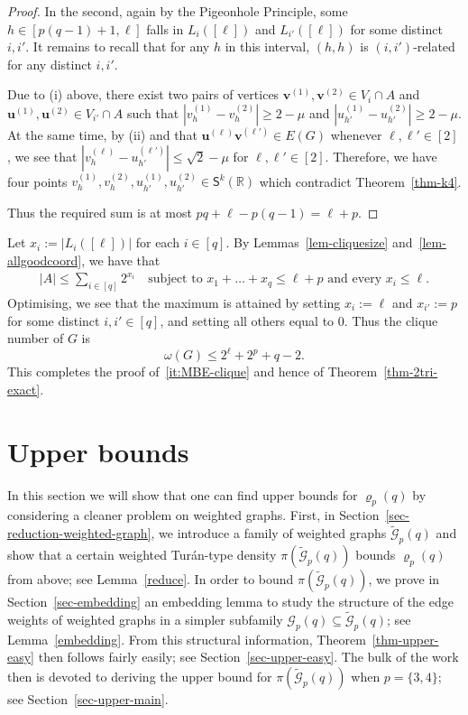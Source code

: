 \documentclass[11pt, a4paper]{article}
\newcommand{\V}[1]{\mathbold{#1}}
\theoremstyle{definition}
\newcommand{\cG}{\mathcal{G}}
\newcommand{\sS}{\mathsf{S}}
\begin{document}
\begin{proof}
	In the second, again by the Pigeonhole Principle, some $h\in [p(q-1)+1,\ell]$ falls in $L_i([\ell])$ and $L_{i'}([\ell])$ for some distinct $i,i'$. It remains to recall that for any $h$ in this interval, $(h,h)$ is $(i,i')$-related for any distinct $i,i'$.
	
	Due to (i) above, there exist two pairs of vertices $\V{v}^{(1)},\V{v}^{(2)}\in V_{i}\cap A$ and $\V{u}^{(1)},\V{u}^{(2)}\in V_{i'}\cap A$ such that $|v^{(1)}_{h} - v^{(2)}_{h}|\ge 2-\mu$ and $|u^{(1)}_{h'} - u^{(2)}_{h'}|\ge 2-\mu$. At the same time, by (ii) and that $\V{u}^{(\ell)}\V{v}^{(\ell')} \in E(G)$ whenever $\ell,\ell' \in [2]$, we see that 
	$|v^{(\ell)}_h-u^{(\ell')}_{h'}| \leq \sqrt{2}-\mu$ for $\ell,\ell' \in [2]$.
	Therefore, we have four points $v^{(1)}_{h},v^{(2)}_{h},u^{(1)}_{h'},u^{(2)}_{h'}\in \sS^k(\mathbb{R})$ which contradict Theorem~\ref{thm-k4}.
	
	Thus the required sum is at most $pq+\ell-p(q-1) = \ell+p$.
\end{proof}

Let $x_i := |L_i([\ell])|$ for each $i \in [q]$.
By Lemmas~\ref{lem-cliquesize} and~\ref{lem-allgoodcoord}, we have that
\begin{align*}
|A|\le \sum_{i\in [q]}2^{x_i}\quad \text{subject to }x_1+\ldots+x_q \leq \ell +p \text{ and every }x_i \leq \ell.
\end{align*}
Optimising, we see that the maximum is attained by setting $x_i:=\ell$ and $x_{i'}:=p$ for some distinct $i,i' \in [q]$, and setting all others equal to $0$.
Thus the clique number of $G$ is
$$
\omega(G) \leq 2^\ell+2^p+q-2.
$$
This completes the proof of~\ref{it:MBE-clique} and hence of Theorem~\ref{thm-2tri-exact}.





\section{Upper bounds}\label{sec-UB}

In this section we will show that one can find upper bounds for $\varrho_p(q)$ by considering a cleaner problem on weighted graphs. First, in Section~\ref{sec-reduction-weighted-graph}, we introduce a family of weighted graphs $\widetilde{\cG}_p(q)$ and show that a certain weighted Tur\'an-type density $\pi(\widetilde{\cG}_p(q))$ bounds $\varrho_p(q)$ from above; see Lemma~\ref{reduce}. In order to bound $\pi(\widetilde{\cG}_p(q))$, we prove in Section~\ref{sec-embedding} an embedding lemma to study the structure of the edge weights of weighted graphs in a simpler subfamily $\cG_p(q) \subseteq \widetilde{\cG}_p(q)$; see Lemma~\ref{embedding}. From this structural information, Theorem~\ref{thm-upper-easy} then follows fairly easily; see Section~\ref{sec-upper-easy}.
The bulk of the work then is devoted to deriving the upper bound for $\pi(\widetilde{\cG}_p(q))$ when $p=\{3,4\}$; see Section~\ref{sec-upper-main}.
\end{document}
